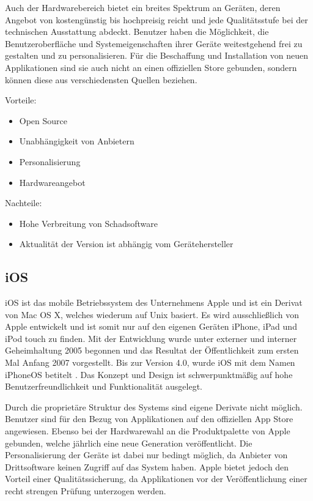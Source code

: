 Auch der Hardwarebereich bietet ein breites Spektrum an Geräten, deren Angebot von kostengünstig bis hochpreisig reicht und jede Qualitätsstufe bei der technischen Ausstattung abdeckt. Benutzer haben die Möglichkeit, die Benutzeroberfläche und Systemeigenschaften ihrer Geräte weitestgehend frei zu gestalten und zu personalisieren. Für die Beschaffung und Installation von neuen Applikationen sind sie auch nicht an einen offiziellen Store gebunden, sondern können diese aus verschiedensten Quellen beziehen.
\\
\pagebreak

Vorteile:
\begin{itemize}
	\item Open Source
	\item Unabhängigkeit von Anbietern
	\item Personalisierung
	\item Hardwareangebot
\end{itemize}

Nachteile:
\begin{itemize}
	\item Hohe Verbreitung von Schadsoftware
	\item Aktualität der Version ist abhängig vom Gerätehersteller
\end{itemize}

\subsection{iOS}
iOS ist das mobile Betriebssystem des Unternehmens Apple und ist ein Derivat von Mac OS X, welches wiederum auf Unix basiert. Es wird ausschließlich von Apple entwickelt und ist somit nur auf den eigenen Geräten iPhone, iPad und iPod touch zu finden. Mit der Entwicklung wurde unter externer und interner Geheimhaltung 2005 begonnen und das Resultat der Öffentlichkeit zum ersten Mal Anfang 2007 vorgestellt. Bis zur Version 4.0, wurde iOS mit dem Namen iPhoneOS betitelt \citep{apple_ios}. Das Konzept und Design ist schwerpunktmäßig auf hohe Benutzerfreundlichkeit und Funktionalität ausgelegt. 

Durch die proprietäre Struktur des Systems sind eigene Derivate nicht möglich. Benutzer sind für den Bezug von Applikationen auf den offiziellen App Store angewiesen.
Ebenso bei der Hardwarewahl an die Produktpalette von Apple gebunden, welche jährlich eine neue Generation veröffentlicht. Die Personalisierung der Geräte ist dabei nur bedingt möglich, da Anbieter von Drittsoftware keinen Zugriff auf das System haben. Apple bietet jedoch den Vorteil einer Qualitätssicherung, da Applikationen vor der Veröffentlichung einer recht strengen Prüfung unterzogen werden.
\\
\pagebreak

